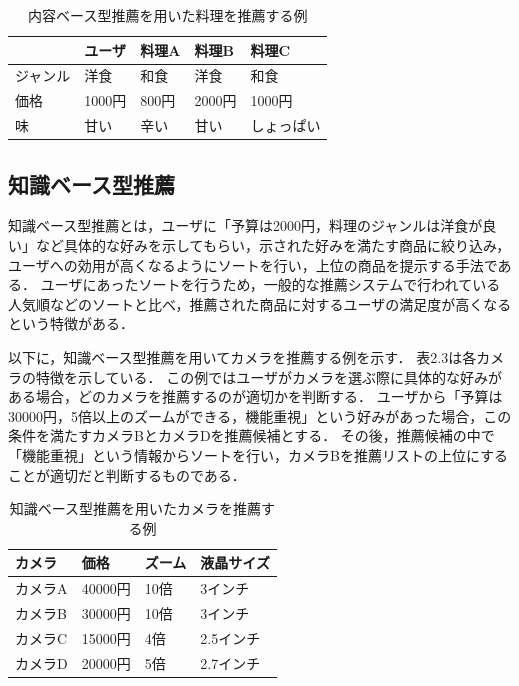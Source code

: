 \documentclass{funthesis}
\begin{document}
\begin{table}[htb]
  \begin{center}
  \scriptsize
    \caption{内容ベース型推薦を用いた料理を推薦する例}
    \normalsize
   \begin{tabular}{p{2.5cm}|p{2.5cm}||p{2.5cm}|p{2.5cm}|p{2.5cm}}
    \hline
    & ユーザ & 料理A & 料理B & 料理C  \\ \hline\hline
      ジャンル & 洋食 & 和食 & 洋食 & 和食 \\ \hline
      価格 & 1000円 & 800円 & 2000円 & 1000円 \\ \hline
      味 & 甘い & 辛い & 甘い & しょっぱい \\ \hline
  \end{tabular}
  \end{center}
\end{table}

\subsection{知識ベース型推薦}
知識ベース型推薦とは，ユーザに「予算は2000円，料理のジャンルは洋食が良い」など具体的な好みを示してもらい，示された好みを満たす商品に絞り込み，
ユーザへの効用が高くなるようにソートを行い，上位の商品を提示する手法である．
ユーザにあったソートを行うため，一般的な推薦システムで行われている人気順などのソートと比べ，推薦された商品に対するユーザの満足度が高くなるという特徴がある．

以下に，知識ベース型推薦を用いてカメラを推薦する例を示す．
表2.3は各カメラの特徴を示している．
この例ではユーザがカメラを選ぶ際に具体的な好みがある場合，どのカメラを推薦するのが適切かを判断する．
ユーザから「予算は30000円，5倍以上のズームができる，機能重視」という好みがあった場合，この条件を満たすカメラBとカメラDを推薦候補とする．
その後，推薦候補の中で「機能重視」という情報からソートを行い，カメラBを推薦リストの上位にすることが適切だと判断するものである．

\begin{table}[htb]
  \begin{center}
  \scriptsize
    \caption{知識ベース型推薦を用いたカメラを推薦する例}
    \normalsize
   \begin{tabular}{p{3.3cm}||p{3.3cm}|p{3.3cm}|p{3.3cm}}
    \hline
カメラ & 価格 & ズーム & 液晶サイズ \\ \hline\hline
      カメラA & 40000円 & 10倍 & 3インチ \\ \hline
      カメラB & 30000円 & 10倍 & 3インチ \\ \hline
      カメラC & 15000円 & 4倍 & 2.5インチ \\ \hline
      カメラD & 20000円 & 5倍 & 2.7インチ \\ \hline
  \end{tabular}
  \end{center}
\end{table}
\end{document}

